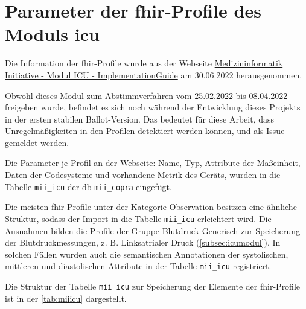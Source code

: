 \section{Parameter der \acs{fhir}-Profile des Moduls \glqq\acs{icu}\grqq{}} \label{sec:fhirprofs}

Die Information der \ac{fhir}-Profile wurde aus der Webseite \href{https://www.medizininformatik-initiative.de/Kerndatensatz/Modul_Intensivmedizin/IGMIIKDSModulICU.html}{Medizininformatik Initiative - Modul ICU - ImplementationGuide} am 30.06.2022 herausgenommen. 

Obwohl dieses Modul zum Abstimmverfahren vom 25.02.2022 bis 08.04.2022 freigeben wurde, befindet es sich noch während der Entwicklung dieses Projekts in der ersten stabilen Ballot-Version. Das bedeutet für diese Arbeit, dass Unregelmäßigkeiten in den Profilen detektiert werden können, und als Issue gemeldet werden.

Die Parameter je Profil an der Webseite: Name, Typ, Attribute der Maßeinheit, Daten der Codesysteme und vorhandene Metrik des Geräts, wurden in die Tabelle \texttt{mii\_icu} der \ac{db} \texttt{mii\_copra} eingefügt.

Die meisten \ac{fhir}-Profile unter der Kategorie \glqq Observation\grqq{} besitzen eine ähnliche Struktur, sodass der Import in die Tabelle \texttt{mii\_icu} erleichtert wird. Die Ausnahmen bilden die Profile der Gruppe \glqq Blutdruck Generisch\grqq{} zur Speicherung der Blutdruckmessungen, z. B. \glqq Linksatrialer Druck\grqq{} (\ref{subsec:icumodul}). In solchen Fällen wurden auch die semantischen Annotationen der systolischen, mittleren und diastolischen Attribute in der Tabelle \texttt{mii\_icu} registriert.

\newpage

Die Struktur der Tabelle \texttt{mii\_icu} zur Speicherung der Elemente der \ac{fhir}-Profile ist in der \ref{tab:miiicu} dargestellt.


